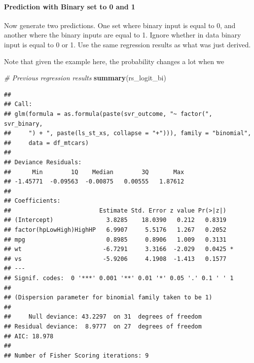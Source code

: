 \documentclass[
]{book}
\newenvironment{Shaded}{\begin{snugshade}}{\end{snugshade}}
\newcommand{\CommentTok}[1]{\textcolor[rgb]{0.56,0.35,0.01}{\textit{#1}}}
\newcommand{\KeywordTok}[1]{\textcolor[rgb]{0.13,0.29,0.53}{\textbf{#1}}}
\newcommand{\NormalTok}[1]{#1}
\begin{document}
\hypertarget{prediction-with-binary-set-to-0-and-1}{%
\paragraph{Prediction with Binary set to 0 and 1}\label{prediction-with-binary-set-to-0-and-1}}

Now generate two predictions. One set where binary input is equal to 0, and another where the binary inputs are equal to 1. Ignore whether in data binary input is equal to 0 or 1. Use the same regression results as what was just derived.

Note that given the example here, the probability changes a lot when we

\begin{Shaded}
\begin{Highlighting}[]
\CommentTok{\# Previous regression results}
\KeywordTok{summary}\NormalTok{(rs\_logit\_bi)}
\end{Highlighting}
\end{Shaded}

\begin{verbatim}
## 
## Call:
## glm(formula = as.formula(paste(svr_outcome, "~ factor(", svr_binary, 
##     ") + ", paste(ls_st_xs, collapse = "+"))), family = "binomial", 
##     data = df_mtcars)
## 
## Deviance Residuals: 
##      Min        1Q    Median        3Q       Max  
## -1.45771  -0.09563  -0.00875   0.00555   1.87612  
## 
## Coefficients:
##                         Estimate Std. Error z value Pr(>|z|)  
## (Intercept)               3.8285    18.0390   0.212   0.8319  
## factor(hpLowHigh)HighHP   6.9907     5.5176   1.267   0.2052  
## mpg                       0.8985     0.8906   1.009   0.3131  
## wt                       -6.7291     3.3166  -2.029   0.0425 *
## vs                       -5.9206     4.1908  -1.413   0.1577  
## ---
## Signif. codes:  0 '***' 0.001 '**' 0.01 '*' 0.05 '.' 0.1 ' ' 1
## 
## (Dispersion parameter for binomial family taken to be 1)
## 
##     Null deviance: 43.2297  on 31  degrees of freedom
## Residual deviance:  8.9777  on 27  degrees of freedom
## AIC: 18.978
## 
## Number of Fisher Scoring iterations: 9
\end{verbatim}
\end{document}
